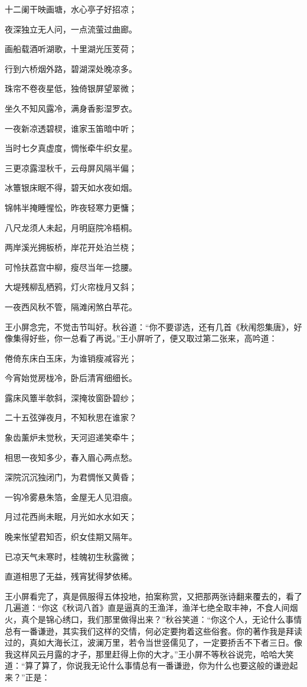 \documentclass[12pt,UTF8]{ctexbook}
\begin{document}
{{{十二阑干映画塘，水心亭子好招凉；

夜深独立无人问，一点流萤过曲廊。

画船载酒听湖歌，十里湖光压芰荷；

行到六桥烟外路，碧湖深处晚凉多。

珠帘不卷夜星低，独倚银屏望翠微；

坐久不知风露冷，满身香影湿罗衣。

一夜新凉透碧棂，谁家玉笛暗中听；

当时七夕真虚度，惆怅牵牛织女星。

三更凉露湿秋千，云母屏风隔半偏；

冰簟银床眠不得，碧天如水夜如烟。

锦帏半掩睡惺忪，昨夜轻寒力更慵；

八尺龙须人未起，月明庭院冷梧桐。

两岸溪光拥板桥，岸花开处泊兰桡；

可怜扶荔宫中柳，瘦尽当年一捻腰。

大堤残柳乱栖鸦，灯火帘栊月又斜；

一夜西风秋不管，隔滩闲煞白苹花。

王小屏念完，不觉击节叫好。秋谷道：“你不要谬选，还有几首《秋闱怨集唐》，好像集得好些，你一总看了再说。”王小屏听了，便又取过第二张来，高吟道：

倦倚东床白玉床，为谁销瘦减容光；

今宵始觉房栊冷，卧后清宵细细长。

露床风簟半欹斜，深掩妆窗卧碧纱；

二十五弦弹夜月，不知秋思在谁家？

象齿薰炉未觉秋，天河迢递笑牵牛；

相思一夜知多少，春入眉心两点愁。

深院沉沉独闭门，为君惆怅又黄昏；

一钩冷雾悬朱箔，金屋无人见泪痕。

月过花西尚未眠，月光如水水如天；

晚来怅望君知否，织女佳期又隔年。

已凉天气未寒时，桂魄初生秋露微；

直道相思了无益，残宵犹得梦依稀。

王小屏看完了，真是佩服得五体投地，拍案称赏，又把那两张诗翻来覆去的，看了几遍道：“你这《秋词八首》直是逼真的王渔洋，渔洋七绝全取丰神，不食人间烟火，真个是锦心绣口，我们那里做得出来？”秋谷笑道：“你这个人，无论什么事情总有一番谦逊，其实我们这样的交情，何必定要拘着这些俗套。你的著作我是拜读过的，真如大海长江，波澜万里，若令当世竖儒见了，一定要挢舌不下者三日。像我这样风云月露的才子，那里赶得上你的大才。”王小屏不等秋谷说完，哈哈大笑道：“算了算了，你说我无论什么事情总有一番谦逊，你为什么也要这般的谦逊起来？”正是：

}}}
\end{document}
